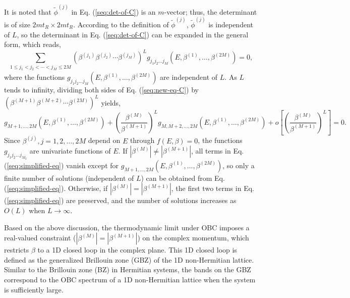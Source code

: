 \documentclass[pdflatex,sn-nature, iicol]{sn-jnl}%
\theoremstyle{thmstyleone}%
\theoremstyle{thmstyletwo}%
\theoremstyle{thmstylethree}%
\begin{document}
It is noted that $\tilde{\phi}^{(j)}$ in Eq. (\ref{seq:det-of-C})
is an $m$-vector; thus, the determinant is of size $2mt_{R}\times2mt_{R}$.
According to the definition of $\tilde{\phi}^{(j)}$, $\tilde{\phi}^{(j)}$
is independent of $L$, so the determinant in Eq. (\ref{seq:det-of-C})
can be expanded in the general form, which reads, 
\begin{equation}
\sum_{1\leq j_{1}<j_{2}<\cdots<j_{M_{}}\leq2M}\left(\beta^{(j_{1})}\beta^{(j_{2})}\cdots\beta^{(j_{M})}\right)^{L}g_{j_{1}j_{2}\dots j_{M}}\left(E,\beta^{(1)},\dots,\beta^{(2M)}\right)=0,\label{seq:new-eq-C}
\end{equation}
where the functions $g_{j_{1}j_{2}\dots j_{M}}\left(E,\beta^{(1)},\dots,\beta^{(2M)}\right)$
are independent of $L$. As $L$ tends to infinity, dividing both
sides of Eq. (\ref{seq:new-eq-C}) by $\left(\beta^{(M+1)}\beta^{(M+2)}\cdots\beta^{(2M)}\right)^{L}$
yields, 
\begin{equation}
g_{M+1,\dots,2M}\left(E,\beta^{(1)},\dots,\beta^{(2M)}\right)+\left(\frac{\beta^{(M)}}{\beta^{(M+1)}}\right)^{L}g_{M,M+2,\dots,2M}\left(E,\beta^{(1)},\dots,\beta^{(2M)}\right)+o\left[\left(\frac{\beta^{(M)}}{\beta^{(M+1)}}\right)^{L}\right]=0.\label{seq:simplified-eq}
\end{equation}
Since $\beta^{(j)},j=1,2,\dots,2M$ depend on $E$ through $f\left(E,\beta\right)=0$,
the functions $g_{j_{1}j_{2}\dots j_{M_{2}}}$ are univariate functions
of $E$. If $\left|\beta^{(M)}\right|\neq\left|\beta^{(M+1)}\right|$,
all terms in Eq. (\ref{seq:simplified-eq}) vanish except for $g_{M+1,\dots,2M}\left(E,\beta^{(1)},\dots,\beta^{(2M)}\right)$,
so only a finite number of solutions (independent of $L$) can be
obtained from Eq. (\ref{seq:simplified-eq}). Otherwise, if $\left|\beta^{(M)}\right|=\left|\beta^{(M+1)}\right|$,
the first two terms in Eq. (\ref{seq:simplified-eq}) are preserved,
and the number of solutions increases as $O(L)$ when $L\rightarrow\infty$.

Based on the above discussion, the thermodynamic limit under OBC imposes
a real-valued constraint ($|\beta^{(M)}|=|\beta^{(M+1)}|$) on the
complex momentum, which restricts $\beta$ to a 1D closed loop in
the complex plane. This 1D closed loop is defined as the generalized
Brillouin zone (GBZ) of the 1D non-Hermitian lattice. Similar to the
Brillouin zone (BZ) in Hermitian systems, the bands on the GBZ correspond
to the OBC spectrum of a 1D non-Hermitian lattice when the system
is sufficiently large.
\end{document}
